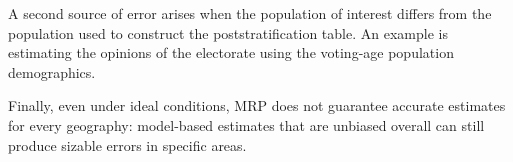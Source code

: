 A second source of error arises when the population of interest differs from the population used to construct the poststratification table.
An example is estimating the opinions of the electorate using the voting-age population demographics.  

Finally, even under ideal conditions, MRP does not guarantee accurate estimates for every geography: model-based estimates that are unbiased overall can still produce sizable errors in specific areas.



